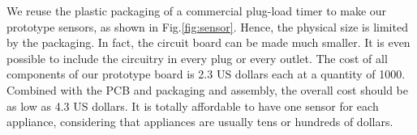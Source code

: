 We reuse the plastic packaging of a commercial plug-load timer to make our prototype sensors, as shown in Fig.\ref{fig:sensor}. Hence, the physical size is limited by the packaging. In fact, the circuit board can be made much smaller. It is even possible to include the circuitry in every plug or every outlet. The cost of all components of our prototype board is 2.3 US dollars each at a quantity of 1000. Combined with the PCB and packaging and assembly, the overall cost should be as low as 4.3 US dollars. It is totally affordable to have one sensor for each appliance, considering that appliances are usually tens or hundreds of dollars. 

